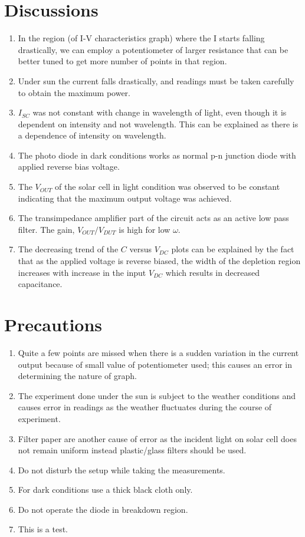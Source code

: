 \documentclass[%
 aip,
 amsmath,amssymb,
 reprint, floatfix%
]{revtex4-2}
\begin{document}
\section{Discussions}
    \begin{enumerate}
        \item In the region (of I-V characteristics graph) where the I starts falling drastically, we can employ a potentiometer of larger resistance that can be better tuned to get more number of points in that region.
        \item Under sun the current falls drastically, and readings must be taken carefully to obtain the maximum power.
        \item $I_{SC}$ was not constant with change in wavelength of light, even though it is dependent on intensity and not wavelength. This can be explained as there is a dependence of intensity on wavelength.
        \item The photo diode in dark conditions works as normal p-n junction diode with applied reverse bias voltage.
        \item The $V_{OUT}$ of the solar cell in light condition was observed to be constant indicating that the maximum output voltage was achieved.
        \item The transimpedance amplifier part of the circuit acts as an active low pass filter. The gain, $V_{OUT}/V_{DUT}$ is high for low $\omega$.
        \item The decreasing trend of the $C$ versus $V_{DC}$ plots can be explained by the fact that as the applied voltage is reverse biased, the width of the depletion region increases with increase in the input $V_{DC}$ which results in decreased capacitance.
    \end{enumerate}

    
\section{Precautions}
    \begin{enumerate}
        \item Quite a few points are missed when there is a sudden variation in the current output because of small value of potentiometer used; this causes an error in determining the nature of graph.
        \item The experiment done under the sun is subject to the weather conditions and causes error in readings as the weather fluctuates during the course of experiment.
        \item Filter paper are another cause of error as the incident light on solar cell does not remain uniform instead plastic/glass filters should be used.
        \item Do not disturb the setup while taking the measurements.
        \item For dark conditions use a thick black cloth only.
        \item Do not operate the diode in breakdown region.
        \item This is a test.
    \end{enumerate}
\end{document}
